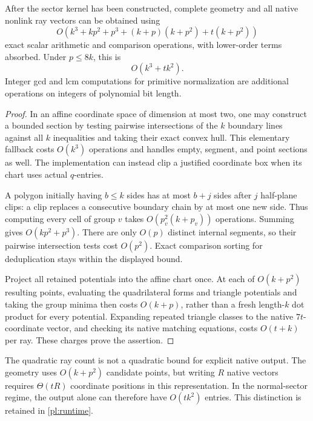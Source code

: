 \begin{proposition}
\label{pl:operations}
After the sector kernel has been constructed, complete geometry
and all native nonlink ray vectors can be obtained using
\[
 O(k^3+kp^2+p^3+(k+p)(k+p^2)+t(k+p^2))
\]
exact scalar arithmetic and comparison operations, with lower-order
terms absorbed.  Under \(p\leq8k\), this is
\begin{equation}
 O(k^3+t k^2).
 \label{pl:runtime}
\end{equation}
Integer gcd and lcm computations for primitive normalization are
additional operations on integers of polynomial bit length.
\end{proposition}
\begin{proof}
In an affine coordinate space of dimension at most two, one may
construct a bounded section by testing pairwise intersections of
the \(k\) boundary lines against all \(k\) inequalities and taking
their exact convex hull.  This elementary fallback costs \(O(k^3)\)
operations and handles empty, segment, and point sections as well.
The implementation can instead clip a justified coordinate box
when its chart uses actual \(q\)-entries.

A polygon initially having \(b\leq k\) sides has at most \(b+j\)
sides after \(j\) half-plane clips: a clip replaces a consecutive
boundary chain by at most one new side.
Thus computing every cell of group \(v\) takes
\(O(p_v^2(k+p_v))\) operations.
Summing gives \(O(kp^2+p^3)\).
There are only \(O(p)\) distinct internal segments, so their pairwise
intersection tests cost \(O(p^2)\).
Exact comparison sorting for deduplication stays within the displayed
bound.

Project all retained potentials into the affine chart once.
At each of \(O(k+p^2)\) resulting points, evaluating the quadrilateral
forms and triangle potentials and taking the group minima then
costs \(O(k+p)\), rather than a fresh length-\(k\) dot product for
every potential.  Expanding repeated triangle classes to the native
\(7t\)-coordinate vector, and checking its native matching equations,
costs \(O(t+k)\) per ray.  These charges prove the assertion.
\end{proof}

The quadratic ray count is not a quadratic bound for explicit
native output.  The geometry uses \(O(k+p^2)\) candidate points,
but writing \(R\) native vectors requires \(\Theta(tR)\) coordinate
positions in this representation.  In the normal-sector regime,
the output alone can therefore have \(O(tk^2)\) entries.
This distinction is retained in \eqref{pl:runtime}.

